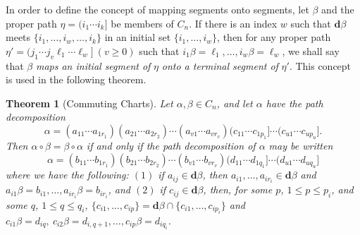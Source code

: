 \documentclass{surv-l}
\numberwithin{equation}{section}
\numberwithin{table}{section}
\numberwithin{figure}{section}
\theoremstyle{plain}
\newtheorem{theorem}[equation]{Theorem}
\theoremstyle{definition}
\begin{document}
In order to define the concept of mapping segments onto segments,
let $\beta$ and the proper path $\eta=(i_{1}\cdots i_{k}]$ be
members of $C_{n}$. If there is an index $w$ such that
$\mathbf{d}\beta$ meets $\{i_{1},\ldots,i_{w},\ldots, i_{k}\}$ in
an initial set $\{i_{1},\ldots,i_{w}\}$, then for any proper path
$\eta'=(j_{1}\cdots j_{v}\ell_{1}\cdots \ell_{w}]\ (v\geq 0)$ such
that $i_{1}\beta= \ell_{1},\ldots, i_{w}\beta=\ell_{w}$, we shall
say that $\beta$ \emph{maps an initial segment of} $\eta$
\emph{onto a terminal segment of} $\eta'$. This concept is used in
the following theorem.

\begin{theorem}[Commuting Charts]\label{thm3.10.1}
Let $\alpha,\beta\in C_{n}$, and let $\alpha$ have the path
decomposition
\[
\alpha=(a_{11}\cdots a_{1r_{1}})(a_{21}\cdots
a_{2r_{2}})\cdots(a_{v1}\cdots a_{vr_{v}})(c_{11}\cdots
c_{1p_{1}}]\cdots(c_{u1}\cdots c_{up_{u}}].
\]
Then $\alpha \circ\beta=\beta \circ\alpha$ if and only if the path
decomposition of $\alpha$ may be written
\[
\alpha=(b_{11}\cdots b_{1r_{1}})(b_{21}\cdots b_{2r_{2}})\cdots(b_{v1}\cdots
b_{vr_{v}})(d_{11}\cdots d_{1q_{1}}]\cdots(d_{u1}\cdots
d_{uq_{u}}]
\]
where we have the following: $(1)$ if $ a_{ij}\in
\mathbf{d}\beta$, then $a_{i1},\ldots, a_{ir_{i}}\in
\mathbf{d}\beta$ and $a_{i1}\beta=b_{i1},\ldots,
a_{ir_{i}}\beta=b_{ir_{i}}$, and $(2)$ if $c_{ij}\in
\mathbf{d}\beta$, then, for some $p$, $1\leq p\leq p_{i}$, and some
$q$, $1\leq q\leq q_{i}$, $\{c_{i1},\ldots,
c_{ip}\}=\mathbf{d}\beta\cap\{c_{i1},\ldots, c_{ip_{i}}\}$ and
$c_{i1}\beta=d_{iq},\ c_{i2}\beta=d_{i,q+1},\ldots,
c_{ip}\beta=d_{iq_{i}}$.
\end{theorem}
\end{document}
